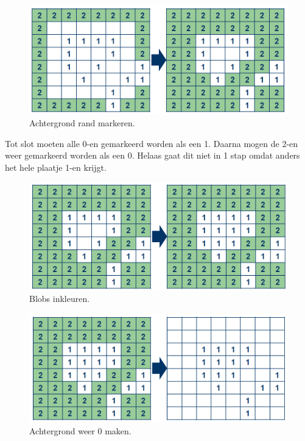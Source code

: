 \begin{figure}
    \begin{center}
        \includegraphics[scale=0.35]{figures/fill_holes_step2.png}
    \end{center}
    \caption{Achtergrond rand markeren.}
    \label{fig:fhstep2}
\end{figure}

Tot slot moeten alle 0-en gemarkeerd worden als een 1. Daarna mogen de 2-en
weer gemarkeerd worden als een 0. Helaas gaat dit niet in 1 stap omdat anders
het hele plaatje 1-en krijgt.

\begin{figure}
    \begin{center}
        \includegraphics[scale=0.35]{figures/fill_holes_step3.png}
    \end{center}
    \caption{Blobs inkleuren.}
    \label{fig:fhstep3}
\end{figure}

\begin{figure}
    \begin{center}
        \includegraphics[scale=0.35]{figures/fill_holes_step4.png}
    \end{center}
    \caption{Achtergrond weer 0 maken.}
    \label{fig:fhstep4}
\end{figure}
